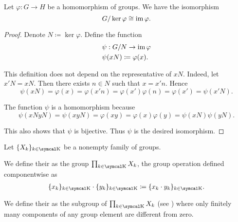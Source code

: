 \begin{theorem}\label{thm:homomorphism_theorem_for_groups}
  Let \( \varphi: G \to H \) be a homomorphism of groups. We have the isomorphism
  \begin{equation*}
    G / \ker \varphi \cong \operatorname{im} \varphi.
  \end{equation*}
\end{theorem}
\begin{proof}
  Denote \( N \coloneqq \ker \varphi \). Define the function
  \begin{align*}
     & \psi: G / N \to \operatorname{im} \varphi   \\
     & \psi(xN) \coloneqq \varphi(x).
  \end{align*}

  This definition does not depend on the representative of \( xN \). Indeed, let \( x'N = xN \). Then there exists \( n \in N \) such that \( x = x' n \). Hence
  \begin{equation*}
    \psi(xN) = \varphi(x) = \varphi(x' n) = \varphi(x') \varphi(n) = \varphi(x') = \psi(x'N).
  \end{equation*}

  The function \( \psi \) is a homomorphism because
  \begin{equation*}
    \psi(xN yN) = \psi(xyN) = \varphi(xy) = \varphi(x) \varphi(y) = \psi(xN) \psi(yN).
  \end{equation*}

  This also shows that \( \psi \) is bijective. Thus \( \psi \) is the desired isomorphism.
\end{proof}

\begin{definition}\label{def:group_direct_product}
  Let \( \{ X_k \}_{k \in \CK} \) be a nonempty family of groups.

  We define their  as the group \( \prod_{k \in \CK} X_k \), the group operation defined componentwise as
  \begin{align*}
    \{ x_k \}_{k \in \CK} \cdot \{ y_k \}_{k \in \CK}
    \coloneqq
    \{ x_k \cdot y_k \}_{k \in \CK}.
  \end{align*}

  We define their  as the subgroup of \( \prod_{k \in \CK} X_k \) (see ) where only finitely many components of any group element are different from zero.
\end{definition}

